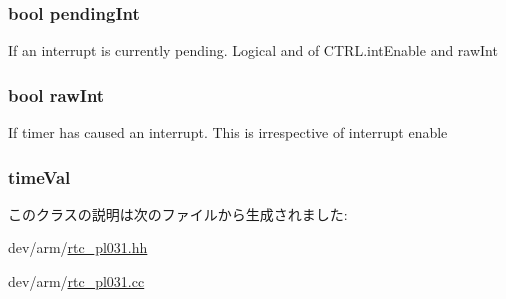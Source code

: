 \label{classPL031_afa49f4e3c316a9e0343eecbcbd92d4dd}
\hypertarget{classPL031_af3f4acf42e0f2210078e61204edbab91}{
\subsubsection[{pendingInt}]{\setlength{\rightskip}{0pt plus 5cm}bool {\bf pendingInt}}}
\label{classPL031_af3f4acf42e0f2210078e61204edbab91}
If an interrupt is currently pending. Logical and of CTRL.intEnable and rawInt \hypertarget{classPL031_a5f9476d82d9f414dccd9b49558d459bc}{
\subsubsection[{rawInt}]{\setlength{\rightskip}{0pt plus 5cm}bool {\bf rawInt}}}
\label{classPL031_a5f9476d82d9f414dccd9b49558d459bc}
If timer has caused an interrupt. This is irrespective of interrupt enable \hypertarget{classPL031_a23ef4b16aed51d417165b72f38e59f33}{
\subsubsection[{timeVal}]{ {\bf timeVal}}}
\label{classPL031_a23ef4b16aed51d417165b72f38e59f33}


このクラスの説明は次のファイルから生成されました:\begin{DoxyCompactItemize}
\item 
dev/arm/\hyperlink{rtc__pl031_8hh}{rtc\_\-pl031.hh}\item 
dev/arm/\hyperlink{rtc__pl031_8cc}{rtc\_\-pl031.cc}\end{DoxyCompactItemize}
